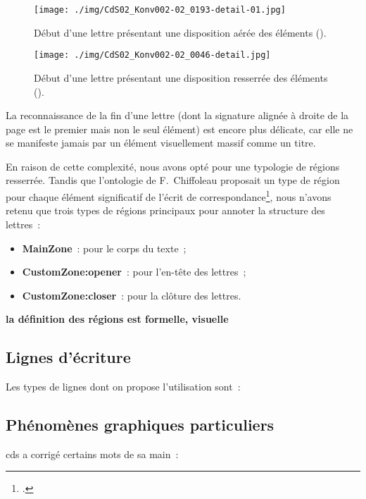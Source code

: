 \documentclass[a4paper,12pt,twoside]{book}
\begin{document}
				\begin{figure}[!h]
					\centering
					\texttt{[image: ./img/CdS02\_Konv002-02\_0193-detail-01.jpg]}%
					\caption{Début d'une lettre présentant une disposition aérée des éléments (\cite{salmCorrespondanceGeneraleSeconde}).}%
					\label{}%
				\end{figure}
			
				\begin{figure}[!h]
					\centering
					\texttt{[image: ./img/CdS02\_Konv002-02\_0046-detail.jpg]}%
					\caption{Début d'une lettre présentant une disposition resserrée des éléments (\cite{salmCorrespondanceGeneraleSeconde}).}%
					\label{}%
				\end{figure}
				
				La reconnaissance de la fin d'une lettre (dont la signature alignée à droite de la page est le premier mais non le seul élément) est encore plus délicate, car elle ne se manifeste jamais par un élément visuellement massif comme un titre.
				
				En raison de cette complexité, nous avons opté pour une typologie de régions resserrée. Tandis que l'ontologie de F.~Chiffoleau proposait un type de région pour chaque élément significatif de l'écrit de correspondance\footcite{chiffoleauCorrespondanceLangueFrancaise2021}, nous n'avons retenu que trois types de régions principaux pour annoter la structure des lettres~:
				
				\begin{itemize}
					\item \textbf{MainZone}~: pour le corps du texte~;
					\item \textbf{CustomZone:opener}~: pour l'en-tête des lettres~;
					\item \textbf{CustomZone:closer}~: pour la clôture des lettres.
				\end{itemize}
			
				\textbf{la définition des régions est formelle, visuelle}
			
			\subsection{Lignes d'écriture}
				Les types de lignes dont on propose l'utilisation sont~:
						
			\subsection{Phénomènes graphiques particuliers}
				 \gls{cds} a corrigé certains mots de sa main~:
			
\end{document}
